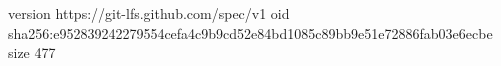 version https://git-lfs.github.com/spec/v1
oid sha256:e952839242279554cefa4c9b9cd52e84bd1085c89bb9e51e72886fab03e6ecbe
size 477
